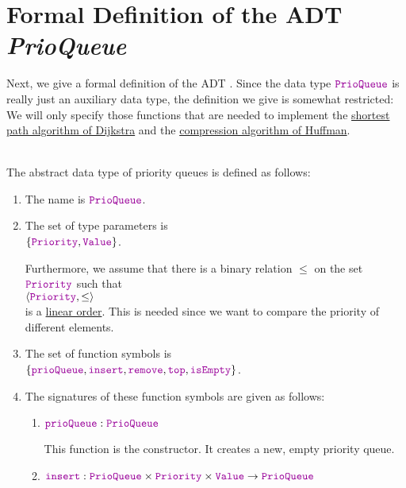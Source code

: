 \section[Formal Definition]{Formal Definition of the ADT \textsl{PrioQueue}}
Next, we give a formal definition of the ADT .  Since the data type
$\mytt{PrioQueue}$ is really just an auxiliary data type, the definition we give is somewhat
restricted: We will only specify those functions that are needed to implement
the \hyperref[sec:dijkstra]{shortest path algorithm of Dijkstra} and the
\hyperref[sec:huffman]{compression algorithm of Huffman}.

\begin{Definition}  \hspace*{\fill} \\
  The abstract data type of priority queues is defined as follows:
  \begin{enumerate}
  \item The name is $\mytt{PrioQueue}$.
  \item The set of type parameters is \\[0.1cm]
        \hspace*{1.3cm} $\{ \mytt{Priority}, \mytt{Value} \}$.

        Furthermore, we assume that there is a binary relation $\leq$ on the set $\mytt{Priority}$ such that
        \\[0.2cm]
        \hspace*{1.3cm}
        $\langle \mytt{Priority}, \leq \rangle$ 
        \\[0.2cm]
        is a \hyperref[def:linear_order]{linear order}.
        This is needed since we want to compare the priority of different elements.
  \item The set of function symbols is \\[0.1cm]
       \hspace*{1.3cm} 
       $\{ \mytt{prioQueue}, \mytt{insert}, \mytt{remove}, \mytt{top}, \mytt{isEmpty} \}$.
  \item The signatures of these function symbols are given as follows:
        \begin{enumerate}
        \item $\mytt{prioQueue}: \mytt{PrioQueue}$

              This function is the constructor. It creates a new, empty priority queue.
        \item $\mytt{insert}: \mytt{PrioQueue} \times \mytt{Priority} \times \mytt{Value} \rightarrow \mytt{PrioQueue}$


\end{enumerate}
\end{enumerate}
\end{Definition}
